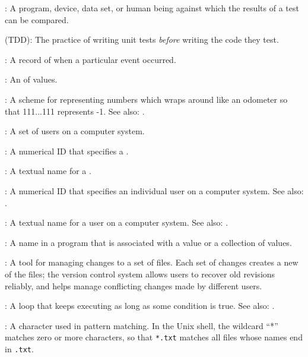 :
A program, device, data set, or human being
against which the results of a test can be compared.

 (TDD):
The practice of writing unit
tests \emph{before} writing the code they test.
 
:
A record of when a particular event occurred.

:
An 
 of values.
 
:
A scheme for representing numbers which wraps around like an odometer
so that 111...111 represents -1.
See also: .
 
:
A set of users on a computer system.
 
:
A numerical ID that specifies a .
 
:
A textual name for a .
 
:
A numerical ID that specifies an individual user on a computer system.
See also: .
 
:
A textual name for a user on a computer system.
See also: .

:
A name in a program that is associated with a value
or a collection of values.

:
A tool for managing changes to a set of files.
Each set of changes creates a new  of the
files; the version control system allows users to recover old revisions
reliably, and helps manage conflicting changes made by different users.
 
:
A loop that keeps executing as long as some condition is true.
See also: .

:
A character used in pattern matching. In the Unix
shell, the wildcard ``*'' matches zero or more characters, so that
\texttt{*.txt} matches all files whose names end in \texttt{.txt}.
